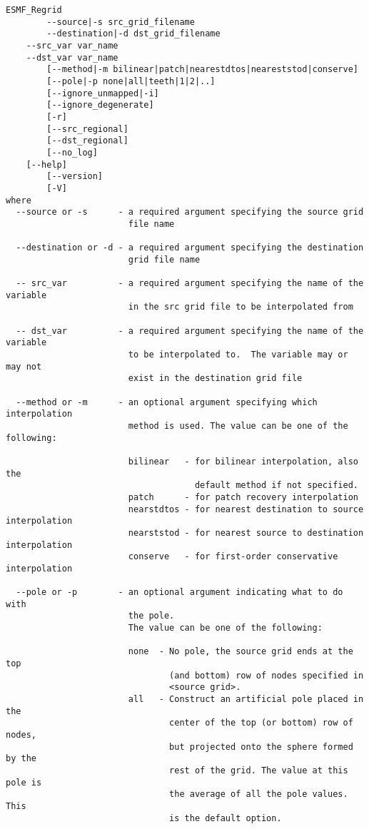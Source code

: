 \begin{verbatim}
ESMF_Regrid  
        --source|-s src_grid_filename
        --destination|-d dst_grid_filename
	--src_var var_name
	--dst_var var_name
        [--method|-m bilinear|patch|nearestdtos|neareststod|conserve]
        [--pole|-p none|all|teeth|1|2|..]
        [--ignore_unmapped|-i]
        [--ignore_degenerate]
        [-r]
        [--src_regional]
        [--dst_regional]
        [--no_log]
	[--help]
        [--version]
        [-V]
where
  --source or -s      - a required argument specifying the source grid
                        file name

  --destination or -d - a required argument specifying the destination
                        grid file name

  -- src_var          - a required argument specifying the name of the variable 
                        in the src grid file to be interpolated from

  -- dst_var          - a required argument specifying the name of the variable 
                        to be interpolated to.  The variable may or may not 
                        exist in the destination grid file

  --method or -m      - an optional argument specifying which interpolation
                        method is used. The value can be one of the following:

                        bilinear   - for bilinear interpolation, also the
                                     default method if not specified.
                        patch      - for patch recovery interpolation
                        nearstdtos - for nearest destination to source interpolation
                        nearststod - for nearest source to destination interpolation
                        conserve   - for first-order conservative interpolation

  --pole or -p        - an optional argument indicating what to do with
                        the pole.
                        The value can be one of the following:

                        none  - No pole, the source grid ends at the top
                                (and bottom) row of nodes specified in
                                <source grid>.
                        all   - Construct an artificial pole placed in the
                                center of the top (or bottom) row of nodes,
                                but projected onto the sphere formed by the
                                rest of the grid. The value at this pole is
                                the average of all the pole values. This
                                is the default option.


\end{verbatim}
